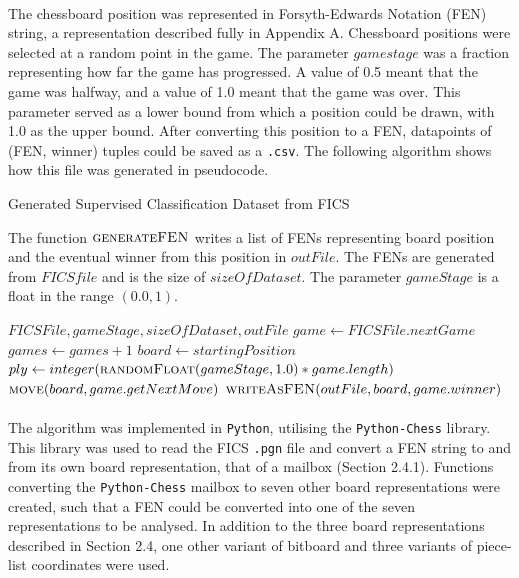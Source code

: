 \documentclass[12pt,a4paper]{book}
\begin{document}
\paragraph{} The chessboard position was represented in Forsyth-Edwards Notation (FEN) string, a representation described fully in Appendix A. Chessboard positions were selected at a random point in the game. The parameter $gamestage$ was a fraction representing how far the game has progressed. A value of 0.5 meant that the game was halfway, and a value of 1.0 meant that the game was over. This parameter served as a lower bound from which a position could be drawn, with 1.0 as the upper bound. After converting this position to a FEN, datapoints of (FEN, winner) tuples could be saved as a \texttt{.csv}. The following algorithm shows how this file was generated in pseudocode.

\begin{algorithm}
  \caption{Generated Supervised Classification Dataset from FICS}
  The function $\Call{generateFEN}{}$ writes a list of FENs representing board position and the eventual winner from this position in $outFile$. The FENs are generated from $FICSfile$ and is the size of $sizeOfDataset$. The parameter $gameStage$ is a float in the range $(0.0, 1)$.
  \begin{algorithmic}[1]
     {$FICSFile, gameStage, sizeOfDataset, outFile$}
    \State $game \gets FICSFile.nextGame$
    \State $games \gets games + 1$
    \State $board \gets startingPosition$
    \State $ply \gets integer(\Call{randomFloat}{gameStage, 1.0} * game.length)$
    \State $\Call{move}{board, game.getNextMove}$
    \EndWhile
    \State $\Call{writeAsFEN}{outFile, board, game.winner}$
    \EndIf
    \EndWhile
    \EndFunction
  \end{algorithmic}
\end{algorithm}

\paragraph{} The algorithm was implemented in \texttt{Python}, utilising the \texttt{Python-Chess} library. This library was used to read the FICS \texttt{.pgn} file and convert a FEN string to and from its own board representation, that of a mailbox (Section 2.4.1). Functions converting the \texttt{Python-Chess} mailbox to seven other board representations were created, such that a FEN could be converted into one of the seven representations to be analysed. In addition to the three board representations described in Section 2.4, one other variant of bitboard and three variants of piece-list coordinates were used.
\end{document}
